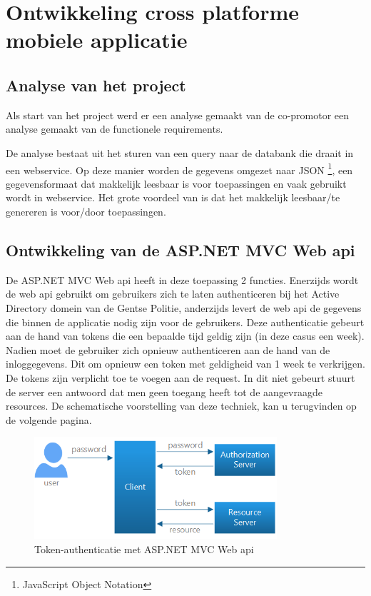 \chapter{Ontwikkeling cross platforme mobiele applicatie}
\label{ch:ontwikkelingcrossplatformapp}
\section{Analyse van het project}
Als start van het project werd er een analyse gemaakt van de co-promotor
een analyse gemaakt van de functionele requirements.

De analyse bestaat uit het sturen van een query naar de databank die draait in een webservice.
Op deze manier worden de gegevens omgezet naar JSON \footnote{JavaScript Object Notation}, een gegevensformaat dat makkelijk
leesbaar is voor toepassingen en vaak gebruikt wordt in webservice.  Het grote voordeel van \cite{inleidingtotjson}
is dat het makkelijk leesbaar/te genereren is voor/door toepassingen.

\section{Ontwikkeling van de ASP.NET MVC Web api}
De ASP.NET MVC Web api heeft in deze toepassing 2 functies. Enerzijds wordt de web api gebruikt om gebruikers zich te laten
authenticeren bij het Active Directory domein van de Gentse Politie, anderzijds levert de web api de gegevens die binnen
de applicatie nodig zijn voor de gebruikers. Deze authenticatie gebeurt aan de hand van tokens die een bepaalde tijd geldig zijn
(in deze casus een week). Nadien moet de gebruiker zich opnieuw authenticeren aan de hand van de inloggegevens. Dit om opnieuw een
token met geldigheid van 1 week te verkrijgen. De tokens zijn verplicht toe te voegen aan de request. In dit niet gebeurt stuurt
de server een antwoord dat men geen toegang heeft tot de aangevraagde resources. De schematische voorstelling van deze techniek,
kan u terugvinden op de volgende pagina.

\begin{figure}[ht!]
\centering
\caption{Token-authenticatie met ASP.NET MVC Web api}
\includegraphics[width=90mm]{./img/authentication.png}
\end{figure}

